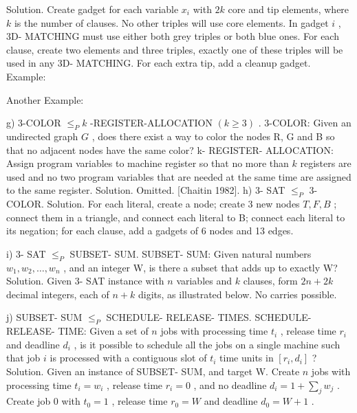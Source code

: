 \documentclass[10pt,a4paper]{article}
\begin{document}
Solution. Create gadget for each variable \(x_{i}\) with \(2k\) core and tip elements, where \(k\) is the number of clauses. No other triples will use core elements. In gadget \(i\) , 3D- MATCHING must use either both grey triples or both blue ones. For each clause, create two elements and three triples, exactly one of these triples will be used in any 3D- MATCHING. For each extra tip, add a cleanup gadget. Example:
\begin{center}
\end{center}
Another Example:
\begin{center}
\end{center}
g) 3-COLOR \(\leq_{P}k\) -REGISTER-ALLOCATION \((k\geq 3)\) .
3-COLOR: Given an undirected graph \(G\) , does there exist a way to color the nodes R, G and B so that no adjacent nodes have the same color?
k- REGISTER- ALLOCATION: Assign program variables to machine register so that no more than \(k\) registers are used and no two program variables that are needed at the same time are assigned to the same register.
Solution. Omitted. [Chaitin 1982].
h) 3- SAT \(\leq_{P}\) 3-COLOR.
Solution. For each literal, create a node; create 3 new nodes \(T, F, B\) ; connect them in a triangle, and connect each literal to B; connect each literal to its negation; for each clause, add a gadgets of 6 nodes and 13 edges.
\begin{center}
\end{center}
i) 3- SAT \(\leq_{P}\) SUBSET- SUM.
SUBSET- SUM: Given natural numbers \(w_{1}, w_{2}, \ldots , w_{n}\) , and an integer W, is there a subset that adds up to exactly W?
Solution. Given 3- SAT instance with \(n\) variables and \(k\) clauses, form \(2n + 2k\) decimal integers, each of \(n + k\) digits, as illustrated below. No carries possible.
\begin{center}
\end{center}
j) SUBSET- SUM \(\leq_{P}\) SCHEDULE- RELEASE- TIMES.
SCHEDULE- RELEASE- TIME: Given a set of \(n\) jobs with processing time \(t_i\) , release time \(r_i\) and deadline \(d_i\) , is it possible to schedule all the jobs on a single machine such that job \(i\) is processed with a contiguous slot of \(t_i\) time units in \([r_i, d_i]\) ?
Solution. Given an instance of SUBSET- SUM, and target W. Create \(n\) jobs with processing time \(t_i = w_i\) , release time \(r_i = 0\) , and no deadline \(d_i = 1 + \sum_j w_j\) . Create job 0 with \(t_0 = 1\) , release time \(r_0 = W\) and deadline \(d_0 = W + 1\) .
\begin{center}
\end{center}
\end{document}

